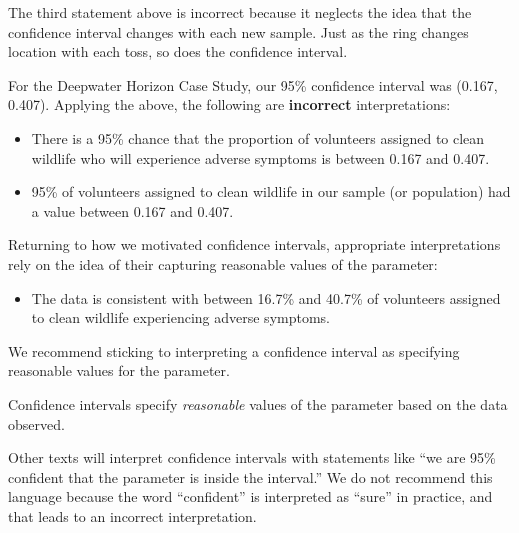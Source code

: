 \documentclass[
  letterpaper,
  DIV=11,
  numbers=noendperiod]{scrreprt}
\providecommand{\tightlist}{%
  \setlength{\itemsep}{0pt}\setlength{\parskip}{0pt}}\usepackage{longtable,booktabs,array}
\theoremstyle{plain}
\theoremstyle{definition}
\theoremstyle{definition}
\theoremstyle{remark}
\begin{document}
The third statement above is incorrect because it neglects the idea that
the confidence interval changes with each new sample. Just as the ring
changes location with each toss, so does the confidence interval.

For the Deepwater Horizon Case Study, our 95\% confidence interval was
(0.167, 0.407). Applying the above, the following are \textbf{incorrect}
interpretations:

\begin{itemize}
\tightlist
\item
  There is a 95\% chance that the proportion of volunteers assigned to
  clean wildlife who will experience adverse symptoms is between 0.167
  and 0.407.
\item
  95\% of volunteers assigned to clean wildlife in our sample (or
  population) had a value between 0.167 and 0.407.
\end{itemize}

Returning to how we motivated confidence intervals, appropriate
interpretations rely on the idea of their capturing reasonable values of
the parameter:

\begin{itemize}
\tightlist
\item
  The data is consistent with between 16.7\% and 40.7\% of volunteers
  assigned to clean wildlife experiencing adverse symptoms.
\end{itemize}

We recommend sticking to interpreting a confidence interval as
specifying reasonable values for the parameter.

\begin{tcolorbox}[enhanced jigsaw, breakable, titlerule=0mm, colframe=quarto-callout-tip-color-frame, bottomtitle=1mm, opacityback=0, rightrule=.15mm, toptitle=1mm, arc=.35mm, bottomrule=.15mm, left=2mm, title=\textcolor{quarto-callout-tip-color}{\faLightbulb}\hspace{0.5em}{Big Idea}, leftrule=.75mm, coltitle=black, toprule=.15mm, colbacktitle=quarto-callout-tip-color!10!white, colback=white, opacitybacktitle=0.6]

Confidence intervals specify \emph{reasonable} values of the parameter
based on the data observed.

\end{tcolorbox}

\begin{tcolorbox}[enhanced jigsaw, breakable, titlerule=0mm, colframe=quarto-callout-note-color-frame, bottomtitle=1mm, opacityback=0, rightrule=.15mm, toptitle=1mm, arc=.35mm, bottomrule=.15mm, left=2mm, title=\textcolor{quarto-callout-note-color}{\faInfo}\hspace{0.5em}{Note}, leftrule=.75mm, coltitle=black, toprule=.15mm, colbacktitle=quarto-callout-note-color!10!white, colback=white, opacitybacktitle=0.6]

Other texts will interpret confidence intervals with statements like
``we are 95\% confident that the parameter is inside the interval.'' We
do not recommend this language because the word ``confident'' is
interpreted as ``sure'' in practice, and that leads to an incorrect
interpretation.

\end{tcolorbox}
\end{document}

